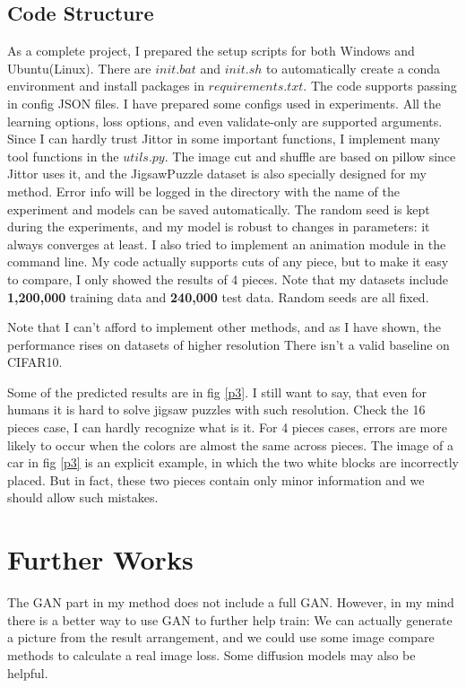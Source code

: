\documentclass[conference]{IEEEtran}
\begin{document}
	\subsection{Code Structure}
	As a complete project, I prepared the setup scripts for both Windows and Ubuntu(Linux). There are $init.bat$ and $init.sh$ to automatically create a conda environment and install packages in $requirements.txt$. The code supports passing in config JSON files. I have prepared some configs used in experiments. All the learning options, loss options, and even validate-only are supported arguments. Since I can hardly trust Jittor in some important functions, I implement many tool functions in the $utils.py$. The image cut and shuffle are based on pillow since Jittor uses it, and the JigsawPuzzle dataset is also specially designed for my method. Error info will be logged in the directory with the name of the experiment and models can be saved automatically. The random seed is kept during the experiments, and my model is robust to changes in parameters: it always converges at least. I also tried to implement an animation module in the command line.
	My code actually supports cuts of any piece, but to make it easy to compare, I only showed the results of 4 pieces. Note that my datasets include \textbf{1,200,000} training data and \textbf{240,000} test data. Random seeds are all fixed.

	
	Note that I can't afford to implement other methods, and as I have shown, the performance rises on datasets of higher resolution There isn't a valid baseline on CIFAR10. 
	
	Some of the predicted results are in fig \ref{p3}. I still want to say, that even for humans it is hard to solve jigsaw puzzles with such resolution. Check the 16 pieces case, I can hardly recognize what is it. For 4 pieces cases, errors are more likely to occur when the colors are almost the same across pieces. The image of a car in fig \ref{p3} is an explicit example, in which the two white blocks are incorrectly placed. But in fact, these two pieces contain only minor information and we should allow such mistakes. 
	
	\section{\textbf{Further Works}}
	The GAN part in my method does not include a full GAN. However, in my mind there is a better way to use GAN to further help train: We can actually generate a picture from the result arrangement, and we could use some image compare methods to calculate a real image loss. Some diffusion models may also be helpful.
\end{document}

